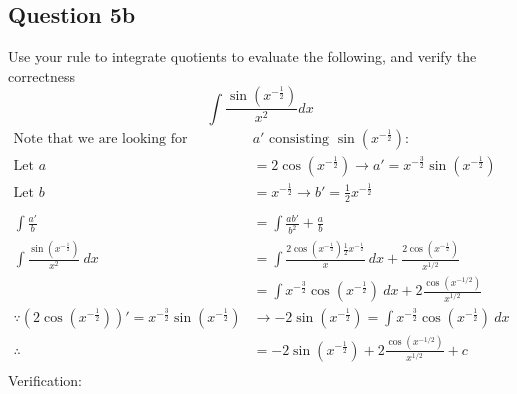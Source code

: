\documentclass{article}
\begin{document}
\subsection*{Question 5b}
Use your rule to integrate quotients to evaluate the following, and verify the correctness
\[\int\frac{\sin{(x^{-\frac{1}{2}})}}{x^2}dx\]
\begin{align*}
    \text{Note that we are looking for }                                        & a'\text{ consisting }\sin(x^{-\frac{1}{2}}):                                                                     \\
    \text{Let }a                                                                & = 2\cos(x^{-\frac{1}{2}}) \rightarrow a' =x^{-\frac{3}{2}}\sin(x^{-\frac{1}{2}})                                 \\
    \text{Let }b                                                                & = x^{-\frac{1}{2}} \rightarrow b' = \frac{1}{2}x^{-\frac{1}{2}}                                                  \\
    \\
    \int\frac{a'}{b}                                                            & = \int\frac{ab'}{b^2} + \frac{a}{b}                                                                              \\
    \int\frac{\sin{(x^{-\frac{1}{2}})}}{x^2}\:dx                                & = \int\frac{2\cos(x^{-\frac{1}{2}})\frac{1}{2}x^{-\frac{1}{2}}}{x}\:dx + \frac{2\cos(x^{-\frac{1}{2}})}{x^{1/2}} \\
                                                                                & = \int x^{-\frac{3}{2}}\cos(x^{-\frac{1}{2}})\:dx + 2\frac{\cos(x^{-1/2})}{x^{1/2}}                              \\
    \because (2\cos(x^{-\frac{1}{2}}))' =x^{-\frac{3}{2}}\sin(x^{-\frac{1}{2}}) & \rightarrow-2\sin(x^{-\frac{1}{2}}) = \int x^{-\frac{3}{2}}\cos(x^{-\frac{1}{2}})\:dx                            \\
    \therefore                                                                  & = -2\sin(x^{-\frac{1}{2}}) + 2\frac{\cos(x^{-1/2})}{x^{1/2}} + c                                                 \\
\end{align*}
Verification:
\end{document}
